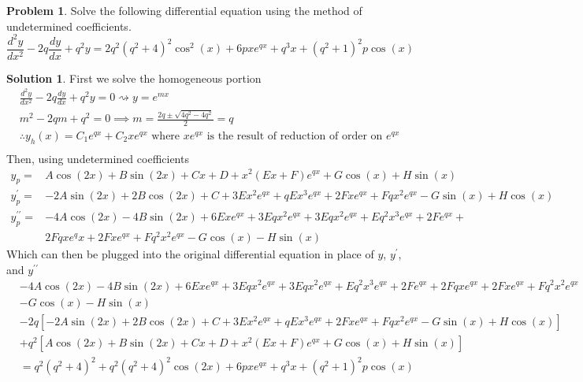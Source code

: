\documentclass[10pt]{article}
\theoremstyle{definition}
\newtheorem{problem}{Problem}
\newtheorem{soln}{Solution}
\begin{document}
\begin{problem}
Solve the following differential equation using the method of undetermined coefficients.
$$\frac{d^2y}{dx^2}-2q\frac{dy}{dx}+q^2y=2q^2\left(q^2+4\right)^2\cos^2\left(x\right)+6pxe^{qx}+q^3x+(q^2+1)^2p\cos\left(x\right)$$
\end{problem}
\begin{soln} First we solve the homogeneous portion
  \begin{align*}
     & \frac{d^2y}{dx^2}-2q\frac{dy}{dx}+q^2y=0\rightsquigarrow y=e^{mx}                                                    \\
     & m^2-2qm+q^2=0 \implies m = \frac{2q\pm\sqrt{4q^2-4q^2}}{2} = q                                                       \\
     & \therefore y_h(x)=C_1e^{qx}+C_2xe^{qx} \text{ where } xe^{qx} \text{ is the result of reduction of order on } e^{qx} \\
  \end{align*}
  Then, using undetermined coefficients
  \begin{align*}
    y_p=                & A\cos\left(2x\right)+B\sin\left(2x\right)+Cx+D+x^2\left(Ex+F\right)e^{qx}+G\cos(x)+H\sin(x) \\
    y_p^\prime=         & -2A\sin(2x)+2B\cos(2x)+C+3Ex^2e^{qx}+qEx^3e^{qx}+2Fxe^{qx}+Fqx^2e^{qx}-G\sin(x)+H\cos(x)    \\
    y_p^{\prime\prime}= & -4A\cos(2x)-4B\sin(2x)+6Exe^{qx}+3Eqx^2e^{qx}+3Eqx^2e^{qx}+Eq^2x^3e^{qx}+2Fe^{qx}+          \\
                        & 2Fqxe^qx+2Fxe^{qx}+Fq^2x^2e^{qx}-G\cos(x)-H\sin(x)
  \end{align*}
  Which can then be plugged into the original differential equation in place of $y$, $y^\prime$, and $y^{\prime\prime}$
  \begin{align*}
     & -4A\cos(2x)-4B\sin(2x)+6Exe^{qx}+3Eqx^2e^{qx}+3Eqx^2e^{qx}+Eq^2x^3e^{qx}+2Fe^{qx}+2Fqxe^{qx}+2Fxe^{qx}+Fq^2x^2e^{qx} \\ &-G\cos(x)-H\sin(x)    \\
     & -2q\left[-2A\sin(2x)+2B\cos(2x)+C+3Ex^2e^{qx}+qEx^3e^{qx}+2Fxe^{qx}+Fqx^2e^{qx}-G\sin(x)+H\cos(x)\right]             \\
     & +q^2\left[A\cos\left(2x\right)+B\sin\left(2x\right)+Cx+D+x^2\left(Ex+F\right)e^{qx}+G\cos(x)+H\sin(x)\right]         \\
     & =q^2\left(q^2+4\right)^2+q^2\left(q^2+4\right)^2\cos\left(2x\right)+6pxe^{qx}+q^3x+(q^2+1)^2p\cos\left(x\right)

\end{align*}
\end{soln}
\end{document}
